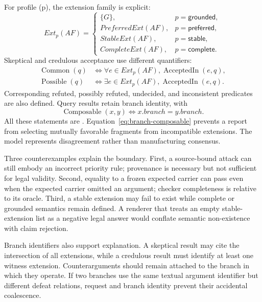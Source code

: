 For profile (p), the extension family is explicit:
\begin{equation}
Ext_p(AF)=
\begin{cases}
\{G\},&p=\mathsf{grounded},\\
PreferredExt(AF),&p=\mathsf{preferred},\\
StableExt(AF),&p=\mathsf{stable},\\
CompleteExt(AF),&p=\mathsf{complete}.
\end{cases}
\label{eq:extension-family}
\end{equation}
Skeptical and credulous acceptance use different quantifiers:
\begin{align}
\operatorname{Common}(q)&\iff
\forall e\in Ext_p(AF),\operatorname{AcceptedIn}(e,q),
\label{eq:common}\\
\operatorname{Possible}(q)&\iff
\exists e\in Ext_p(AF),\operatorname{AcceptedIn}(e,q).
\label{eq:possible}
\end{align}
Corresponding refuted, possibly refuted, undecided, and inconsistent predicates are also defined. Query results retain branch identity, with
\begin{equation}
\operatorname{Composable}(x,y)\iff x.branch=y.branch.
\label{eq:branch-composable}
\end{equation}
All these statements are \formalized{}. Equation~\eqref{eq:branch-composable} prevents a report from selecting mutually favorable fragments from incompatible extensions. The model represents disagreement rather than manufacturing consensus.

Three counterexamples explain the boundary. First, a source-bound attack can still embody an incorrect priority rule; provenance is necessary but not sufficient for legal validity. Second, equality to a frozen expected carrier can pass even when the expected carrier omitted an argument; checker completeness is relative to its oracle. Third, a stable extension may fail to exist while complete or grounded semantics remain defined. A renderer that treats an empty stable-extension list as a negative legal answer would conflate semantic non-existence with claim rejection.

Branch identifiers also support explanation. A skeptical result may cite the intersection of all extensions, while a credulous result must identify at least one witness extension. Counterarguments should remain attached to the branch in which they operate. If two branches use the same textual argument identifier but different defeat relations, request and branch identity prevent their accidental coalescence.

